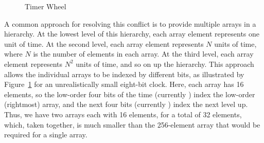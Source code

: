 \begin{figure}[tb]
\centering
{}
\caption{Timer Wheel}
\label{fig:advsync:Timer Wheel}
\end{figure}

A common approach for resolving this conflict is to provide multiple
arrays in a hierarchy.
At the lowest level of this hierarchy, each array element represents
one unit of time.
At the second level, each array element represents $N$ units of time,
where $N$ is the number of elements in each array.
At the third level, each array element represents $N^2$ units of time,
and so on up the hierarchy.
This approach allows the individual arrays to be indexed by different
bits, as illustrated by
Figure~\ref{fig:advsync:Timer Wheel}
for an unrealistically small eight-bit clock.
Here, each array has 16 elements, so the low-order four bits of the time
(currently ) index the low-order (rightmost) array, and the
next four bits (currently ) index the next level up.
Thus, we have two arrays each with 16 elements, for a total of 32 elements,
which, taken together, is much smaller than the 256-element array that
would be required for a single array.

